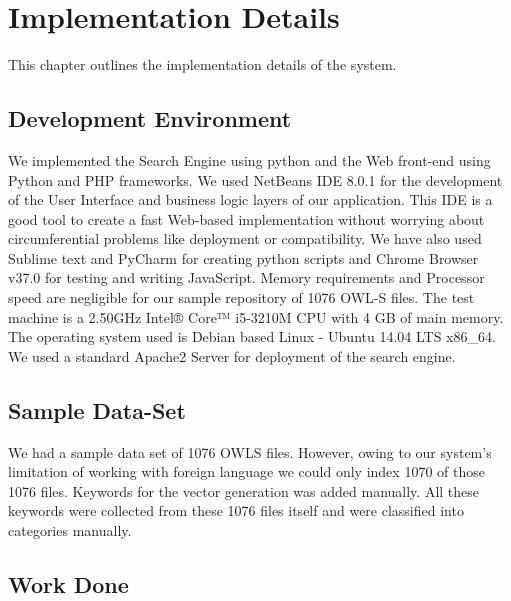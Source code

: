 \documentclass[12pt, oneside]{book}
\begin{document}
\chapter{Implementation Details}
This chapter outlines the implementation details of the system.
\section{Development Environment}
We implemented the Search Engine using python and the Web front-end using Python and PHP frameworks. We used  NetBeans IDE 8.0.1 for the development of the User Interface and business logic layers of our  application. This IDE is a good tool to create a fast Web-based implementation without worrying about circumferential problems like deployment or compatibility. We have also used Sublime text and PyCharm for creating python scripts and Chrome Browser v37.0 for testing and writing JavaScript. Memory requirements and Processor speed are negligible for our sample repository of 1076 OWL-S files. The test machine is a 2.50GHz Intel® Core™ i5-3210M CPU with 4 GB of main memory. The operating system used is Debian based Linux - Ubuntu 14.04 LTS x86\_64. We used a standard Apache2 Server for deployment of the search engine.
\section{Sample Data-Set}
We had a sample data set of 1076 OWLS files. However, owing to our system's limitation of working with foreign language we could only index 1070 of those 1076 files. Keywords for the vector generation was added manually. All these keywords were collected from these 1076 files itself and were classified into categories manually.
\section{Work Done}
\end{document}
